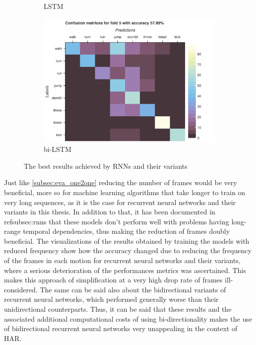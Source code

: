 \begin{figure}[H]
\begin{subfigure}[b]{0.49\textwidth}
				\caption{LSTM}
			\end{subfigure}
			\hfill
			\begin{subfigure}[b]{0.49\textwidth}
				\centering
				\includegraphics[width=\textwidth]{img/bi-LSTM-confusion_matrix.png}
				\caption{bi-LSTM}
			\end{subfigure}
			\caption{The best results achieved by RNNs and their variants}
			\label{fig:confusion-matrix-raw-seq}
		\end{figure}
		Just like \ref{subsec:eva_one2one} reducing the number of frames would be very beneficial, more so for machine learning algorithms that take longer to train on very long sequences, as it is the case for recurrent neural networks and their variants in this thesis. In addition to that, it has been documented in ref{subsec:rnns} that these models don't perform well with problems having long-range temporal dependencies, thus making the reduction of frames doubly beneficial. The visualizations of the results obtained by training the models with reduced frequency show how the accuracy changed due to reducing the frequency of the frames in each motion for recurrent neural networks and their variants, where a serious deterioration of the performances metrics was ascertained. This makes this approach of simplification at a very high drop rate of frames ill-considered. The same can be said also about the bidirectional variants of recurrent neural networks, which performed generally worse than their unidirectional counterparts. Thus, it can be said that these results and the associated additional computational costs of using bi-directionality makes the use of bidirectional recurrent neural networks very unappealing in the context of HAR.
